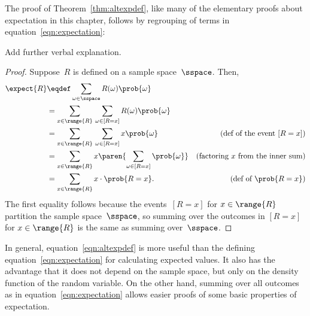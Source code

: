 The proof of Theorem~\ref{thm:altexpdef}, like many of the elementary proofs
about expectation in this chapter, follows by regrouping of terms
in equation~\eqref{eqn:expectation}:
\begin{editingnotes}
Add further verbal explanation.
\end{editingnotes}
\begin{proof}
Suppose~$R$ is defined on a sample space~$\sspace$.  Then,
\begin{align*}
\expect{R}
    &\eqdef \sum_{\omega \in \sspace} R(\omega) \prob{\omega}\\
    &= \sum_{x \in \range{R}} \, \sum_{\omega \in [R=x]} R(\omega) \prob{\omega}
                \\
    &= \sum_{x \in \range{R}} \, \sum_{\omega \in [R=x]} x \prob{\omega}
            &\text{(def of the event $[R=x]$)}\\
    &= \sum_{x \in \range{R}} x \paren{\sum_{\omega \in [R=x]} \prob{\omega}}
            & \text{(factoring $x$ from the inner sum)} \\
    &= \sum_{x \in \range{R}} x \cdot \prob{R = x}.
            & \text{(def of $\prob{R=x}$)}
\end{align*}
The first equality follows because the events~$[R=x]$ for $x \in
\range{R}$ partition the sample space~$\sspace$, so summing over the
outcomes in $[R=x]$ for $x \in \range{R}$ is the same as summing
over~$\sspace$.
\end{proof}

In general, equation~\eqref{eqn:altexpdef} is more useful than the
defining equation~\eqref{eqn:expectation} for calculating expected
values.  It also has the advantage that it does not depend on the
sample space, but only on the density function of the random variable.
On the other hand, summing over all outcomes as in
equation~\eqref{eqn:expectation} allows easier proofs of some basic
properties of expectation.

